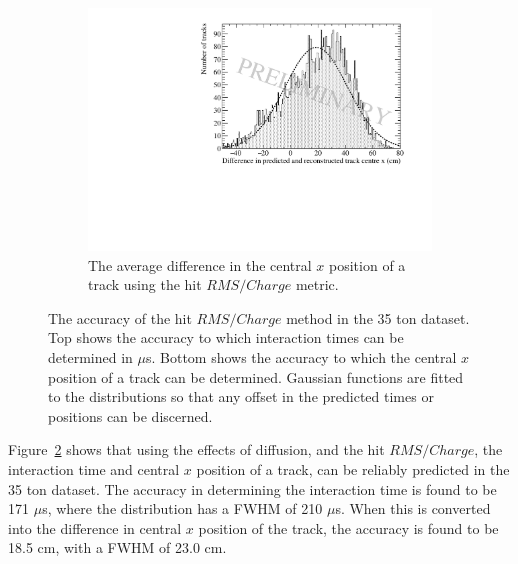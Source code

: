 \begin{figure}
  \begin{subfigure}{0.6\textwidth}
    \centering
    \includegraphics[width=\textwidth]{Data_AvXPosDiff_RMS_Int}
    \caption{The average difference in the central $x$ position of a track using the hit $RMS/Charge$ metric.}
    \label{fig:DiffDataAvDiff_RMS_Int_X}
  \end{subfigure}
  \caption[The accuracy of the hit $RMS/Charge$ method in the 35 ton dataset]
          {The accuracy of the hit $RMS/Charge$ method in the 35 ton dataset. Top shows the accuracy to which interaction times can be determined in $\mu$s. Bottom shows the accuracy to which the central $x$ position of a track can be determined. Gaussian functions are fitted to the distributions so that any offset in the predicted times or positions can be discerned.}
  \label{fig:DiffDataAvDiff_RMS_Int}
\end{figure}

Figure~\ref{fig:DiffDataAvDiff_RMS_Int} shows that using the effects of diffusion, and the hit $RMS/Charge$, the interaction time and central $x$ position of a track, can be reliably predicted in the 35 ton dataset. The accuracy in determining the interaction time is found to be 171 $\mu$s, where the distribution has a FWHM of 210 $\mu$s. When this is converted into the difference in central $x$ position of the track, the accuracy is found to be 18.5 cm, with a FWHM of 23.0 cm. \\


